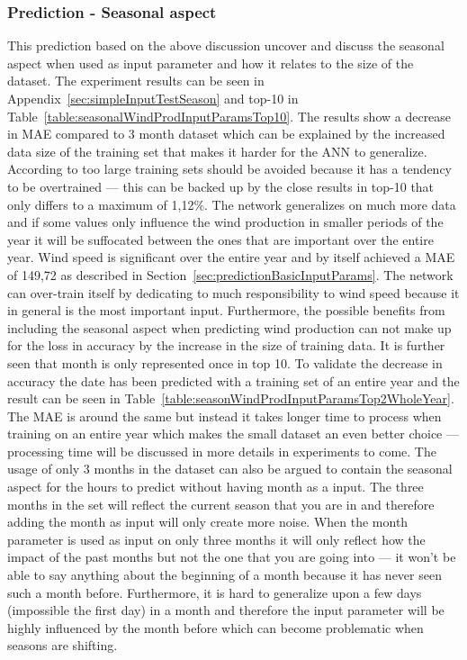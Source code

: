 \subsubsection{Prediction - Seasonal aspect}
\label{sec:predictionWindProdSeasonalExperiment}
This prediction based on the above discussion uncover and discuss the seasonal aspect when used as input parameter and how it relates to the size of the dataset. The experiment results can be seen in Appendix~\ref{sec:simpleInputTestSeason} and top-10 in Table~\ref{table:seasonalWindProdInputParamsTop10}. The results show a decrease in MAE compared to 3 month dataset which can be explained by the increased data size of the training set that makes it harder for the ANN to generalize. According to\cite{1} too large training sets should be avoided because it has a tendency to be overtrained --- this can be backed up by the close results in top-10 that only differs to a maximum of 1,12\%. The network generalizes on much more data and if some values only influence the wind production in smaller periods of the year it will be suffocated between the ones that are important over the entire year. Wind speed is significant over the entire year and by itself achieved a MAE of 149,72 as described in Section~\ref{sec:predictionBasicInputParams}. The network can over-train itself by dedicating to much responsibility to wind speed because it in general is the most important input. 
Furthermore, the possible benefits from including the seasonal aspect when predicting wind production can not make up for the loss in accuracy by the increase in the size of training data. It is further seen that month is only represented once in top 10. To validate the decrease in accuracy the date has been predicted with a training set of an entire year and the result can be seen in Table~\ref{table:seasonWindProdInputParamsTop2WholeYear}. The MAE is around the same but instead it takes longer time to process when training on an entire year which makes the small dataset an even better choice --- processing time will be discussed in more details in experiments to come. The usage of only 3 months in the dataset can also be argued to contain the seasonal aspect for the hours to predict without having month as a input. The three months in the set will reflect the current season that you are in and therefore adding the month as input will only create more noise. When the month parameter is used as input on only three months it will only reflect how the impact of the past months but not the one that you are going into --- it won't be able to say anything about the beginning of a month because it has never seen such a month before. Furthermore, it is hard to generalize upon a few days (impossible the first day) in a month and therefore the input parameter will be highly influenced by the month before which can become problematic when seasons are shifting.

